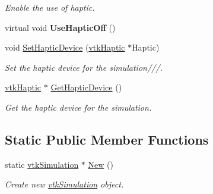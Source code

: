 \begin{DoxyCompactItemize}
\begin{DoxyCompactList}\small\item\em Enable the use of haptic. \item\end{DoxyCompactList}\item 
\hypertarget{classvtkSimulation_ab9f153f65c54a174928ddf4b189b7ead}{
virtual void {\bfseries UseHapticOff} ()}
\label{classvtkSimulation_ab9f153f65c54a174928ddf4b189b7ead}

\item 
\hypertarget{classvtkSimulation_a1071d2cbaa5744869054516946e8d1e0}{
void \hyperlink{classvtkSimulation_a1071d2cbaa5744869054516946e8d1e0}{SetHapticDevice} (\hyperlink{classvtkHaptic}{vtkHaptic} $\ast$Haptic)}
\label{classvtkSimulation_a1071d2cbaa5744869054516946e8d1e0}

\begin{DoxyCompactList}\small\item\em Set the haptic device for the simulation///. \item\end{DoxyCompactList}\item 
\hypertarget{classvtkSimulation_a50c3e6a8584c6e807cf649541b1096ae}{
\hyperlink{classvtkHaptic}{vtkHaptic} $\ast$ \hyperlink{classvtkSimulation_a50c3e6a8584c6e807cf649541b1096ae}{GetHapticDevice} ()}
\label{classvtkSimulation_a50c3e6a8584c6e807cf649541b1096ae}

\begin{DoxyCompactList}\small\item\em Get the haptic device for the simulation. \item\end{DoxyCompactList}\end{DoxyCompactItemize}
\subsection*{Static Public Member Functions}
\begin{DoxyCompactItemize}
\item 
\hypertarget{classvtkSimulation_a7a01eece6a34fb90b64f93e32c7b9d46}{
static \hyperlink{classvtkSimulation}{vtkSimulation} $\ast$ \hyperlink{classvtkSimulation_a7a01eece6a34fb90b64f93e32c7b9d46}{New} ()}
\label{classvtkSimulation_a7a01eece6a34fb90b64f93e32c7b9d46}

\begin{DoxyCompactList}\small\item\em Create new \hyperlink{classvtkSimulation}{vtkSimulation} object. \item\end{DoxyCompactList}\end{DoxyCompactItemize}
